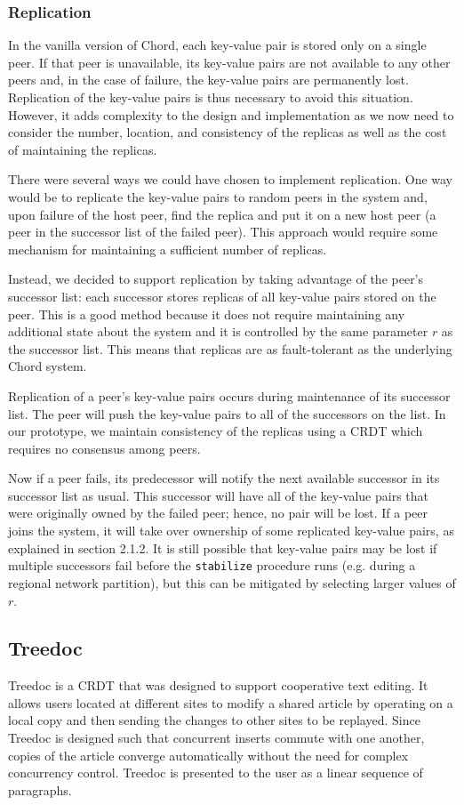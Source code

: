\documentclass[twocolumn]{article}
\begin{document}
\subsubsection{Replication}
In the vanilla version of Chord, each key-value pair is stored only on a single peer. If that peer is unavailable, its key-value pairs are not available to any other peers and, in the case of failure, the key-value pairs are permanently lost. Replication of the key-value pairs is thus necessary to avoid this situation. However, it adds complexity to the design and implementation as we now need to consider the number, location, and consistency of the replicas as well as the cost of maintaining the replicas.

There were several ways we could have chosen to implement replication. One way would be to replicate the key-value pairs to random peers in the system and, upon failure of the host peer, find the replica and put it on a new host peer (a peer in the successor list of the failed peer). This approach would require some mechanism for maintaining a sufficient number of replicas.

Instead, we decided to support replication by taking advantage of the peer's successor list: each successor stores replicas of all key-value pairs stored on the peer. This is a good method because it does not require maintaining any additional state about the system and it is controlled by the same parameter $r$ as the successor list. This means that replicas are as fault-tolerant as the underlying Chord system.

Replication of a peer's key-value pairs occurs during maintenance of its successor list. The peer will push the key-value pairs to all of the successors on the list. In our prototype, we maintain consistency of the replicas using a CRDT which requires no consensus among peers.

Now if a peer fails, its predecessor will notify the next available successor in its successor list as usual. This successor will have all of the key-value pairs that were originally owned by the failed peer; hence, no pair will be lost. If a peer joins the system, it will take over ownership of some replicated key-value pairs, as explained in section 2.1.2. It is still possible that key-value pairs may be lost if multiple successors fail before the \texttt{stabilize} procedure runs (e.g. during a regional network partition), but this can be mitigated by selecting larger values of $r$.

\subsection{Treedoc}
Treedoc is a CRDT that was designed to support cooperative text editing. It allows users located at different sites to modify a shared article by operating on a local copy and then sending the changes to other sites to be replayed. Since Treedoc is designed such that concurrent inserts commute with one another, copies of the article converge automatically without the need for complex concurrency control. Treedoc is presented to the user as a linear sequence of paragraphs.
\end{document}
